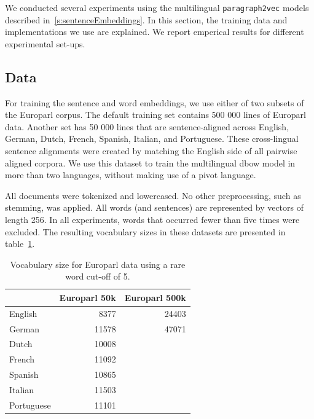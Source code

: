 
We conducted several experiments using the multilingual \texttt{paragraph2vec} models described in~\ref{s:sentenceEmbeddings}. In this section, the training data and implementations we use are explained. We report emperical results for different experimental set-ups.



\subsection{Data}

For training the sentence and word embeddings, we use either of two subsets of the Europarl corpus.
The default training set contains 500 000 lines of Europarl data.
Another set has 50 000 lines that are sentence-aligned across English, German, Dutch, French, Spanish, Italian, and Portuguese.
These cross-lingual sentence alignments were created by matching the English side of all pairwise aligned corpora.
We use this dataset to train the multilingual dbow model in more than two languages, without making use of a pivot language.

All documents were tokenized and lowercased. No other preprocessing, such as stemming, was applied.
All words (and sentences) are represented by vectors of length 256.
In all experiments, words that occurred fewer than five times were excluded.
The resulting vocabulary sizes in these datasets are presented  in table~\ref{t:vocabularies}.

\begin{table}[ht]
\center
\begin{tabular}{l| r r}
		&Europarl 50k 	&Europarl 500k\\\hline
English	&8377			&24403	\\	
German	&11578		&47071	\\
Dutch		&10008				\\
French	&11092				\\	
Spanish	&10865				\\
Italian		&11503				\\
Portuguese	&11101				\\
\end{tabular}
\caption{Vocabulary size for Europarl data using a rare word cut-off of 5.}
\label{t:vocabularies}
\end{table}


